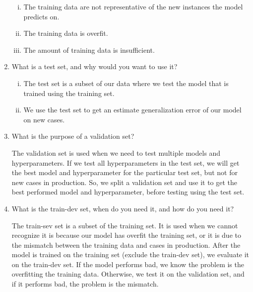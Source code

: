 \documentclass[12pt,reqno]{amsart}
\newif\ifanswer
\begin{document}
\begin{enumerate}[1.]
\ifanswer
{}
\begin{enumerate}[(i)]
\item The training data are not representative of the new instances the model predicts on.
\item The training data is overfit.
\item The amount of training data is insufficient.
\end{enumerate}
\vspace{1cm}



\item What is a test set, and why would you want to use it?

\ifanswer
{}
\begin{enumerate}[(i)]
\item The test set is a subset of our data where we test the model that is trained using the training set.
\item We use the test set to get an estimate generalization error of our model on new cases.
\end{enumerate}
\vspace{1cm}



\item What is the purpose of a validation set?

\ifanswer
{}
The validation set is used when we need to test multiple models and hyperparameters.
If we test all hyperparameters in the test set, we will get the best model and hyperparameter
for the particular test set, but not for new cases in production. So, we split a validation
set and use it to get the best performed model and hyperparameter, before testing using the
test set.
\vspace{1cm}



\item What is the train-dev set, when do you need it, and how do you need it?

\ifanswer
{}
The train-sev set is a subset of the training set. It is used when we cannot recognize it is because our model has overfit the
training set, or it is due to the mismatch between the training data and cases in production.
After the model is trained on the training set (exclude the train-dev set), we evaluate it on the
train-dev set. If the model performs bad, we know the problem is the overfitting the training data. Otherwise,
we test it on the validation set, and if it performs bad, the problem is the mismatch.
\vspace{1cm}




\end{enumerate}
\end{document}
